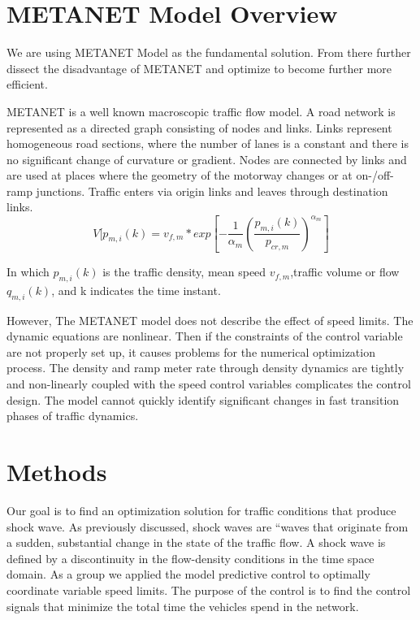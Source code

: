 \documentclass{article}
\begin{document}
\section*{METANET Model Overview}
We are using METANET Model as the fundamental solution. From there further dissect the disadvantage of METANET and optimize to become further more efficient.

METANET is a well known macroscopic traffic flow model.
A road network is represented as a directed graph consisting of nodes and links. Links represent homogeneous
road sections, where the number of lanes is a constant
and there is no significant change of curvature or gradient.
Nodes are connected by links and are used at places where
the geometry of the motorway changes or at on-/off-ramp
junctions. Traffic enters via origin links and leaves through
destination links. $$V[p_{m,i}(k)=v_{f,m}*exp[-\frac{1}{\alpha_{m}}(\frac{p_{m,i}(k)}{p_{cr,m}})^{\alpha_{m}}]$$

In which $p_{m,i}(k)$ is the traffic density, mean speed $v_{f,m}$,traffic volume or flow $q_{m,i}(k)$, and k indicates the time instant.

However,
    The METANET model does not describe the effect of speed limits.
     The dynamic equations are nonlinear. Then if the constraints of the control variable are not properly set up, it causes problems for the numerical optimization process.
     The density and ramp meter rate through density dynamics are tightly and non-linearly coupled with the speed control variables complicates the control design.
    The model cannot quickly identify significant changes in fast transition phases of traffic dynamics. 



\section*{Methods}
\label{sec:headings}

Our goal is to find an optimization solution for traffic conditions that produce shock wave. As previously discussed, shock waves are “waves that originate from a sudden, substantial change in the state of the traffic flow. A shock wave is defined by a discontinuity in the flow-density conditions in the time space domain. As a group we applied the model predictive control to optimally coordinate variable speed limits. The purpose of the control is to find the control signals that minimize the total time the vehicles spend in the network. 
\end{document}
